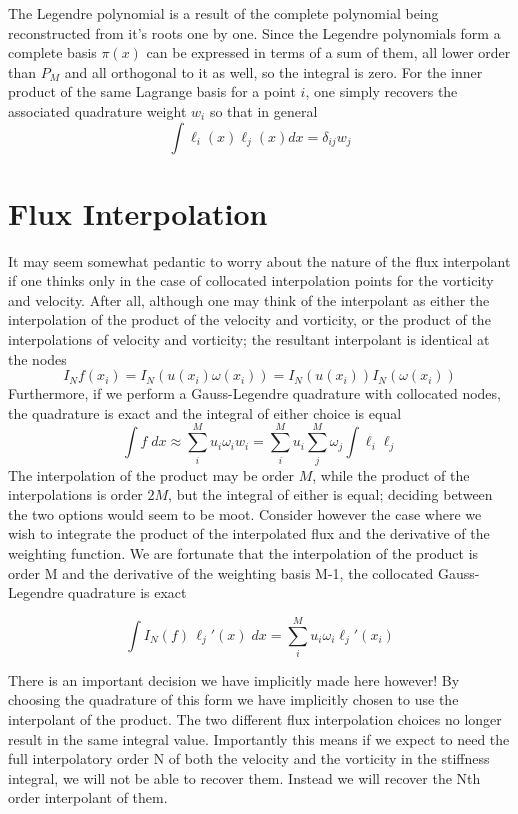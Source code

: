 \documentclass[letterpaper,12pt]{report}
\newcommand{\be}{\begin{equation}}
\newcommand{\ee}{\end{equation}}
\begin{document}
The Legendre polynomial is a result of the complete  polynomial being reconstructed from it's roots one by one. Since the Legendre polynomials form a complete basis $\pi(x)$ can be expressed in terms of a sum of them, all lower order than $P_M$ and all orthogonal to it as well, so the integral is zero. For the inner product of the same Lagrange basis for a point $i$, one simply recovers the associated quadrature weight $w_i$ so that in general
\be \int \ell_i(x) \ell_j(x) dx = \delta_{ij} w_j \ee
%
\section{Flux Interpolation}
It may seem somewhat pedantic to worry about the nature of the flux interpolant if one thinks only in the case of collocated interpolation points for the vorticity and velocity. After all, although one may think of the interpolant as either the interpolation of the product of the velocity and vorticity, or the product of the interpolations of velocity and vorticity; the resultant interpolant is identical at the nodes
\be I_N f(x_i) = I_N(u(x_i) \omega(x_i)) = I_N(u(x_i)) I_N(\omega(x_i)) \ee
Furthermore, if we perform a Gauss-Legendre quadrature with collocated nodes, the quadrature is exact and the integral of either choice is equal
\be \int f \;dx \approx \sum_i^M u_i \omega_i w_i = \sum_i^M u_i \sum_j^M \omega_j \int \ell_i \ell_j \ee
The interpolation of the product may be order $M$, while the product of the interpolations is order $2M$, but the integral of either is equal; deciding between the two options would seem to be moot. Consider however the case where we wish to integrate the product of the interpolated flux and the derivative of the weighting function. We are fortunate that the interpolation of the product is order M and the derivative of the weighting basis M-1, the collocated Gauss-Legendre quadrature is exact

\be \int I_N(f) \, \ell_j'(x) \;dx = \sum_i^M u_i\omega_i \ell_j'(x_i) \ee

There is an important decision we have implicitly made here however! By choosing the quadrature of this form we have implicitly chosen to use the interpolant of the product. The two different flux interpolation choices no longer result in the same integral value. Importantly this means if we expect to need the full interpolatory order N of both the velocity and the vorticity in the stiffness integral, we will not be able to recover them. Instead we will recover the Nth order interpolant of them.
\end{document}
